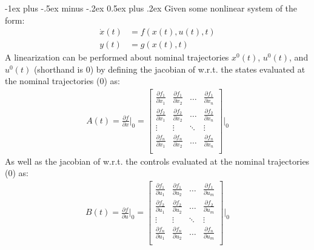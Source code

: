 \documentclass[10pt,landscape]{article}
\makeatletter
\renewcommand{\section}{\@startsection{section}{1}{0mm}%
                                {-1ex plus -.5ex minus -.2ex}%
                                {0.5ex plus .2ex}%
                                {\normalfont\large\bfseries}}
\makeatother
\begin{document}
\begin{multicols}{3}
\section{\color{blue}{Linearization}}
Given some nonlinear system of the form:
\begin{align*}
\dot{x}(t)&=f(x(t),u(t),t)\\
y(t)&=g(x(t),t)
\end{align*}
A linearization can be performed about nominal trajectories $x^0(t)$, $u^0(t)$, and $u^0(t)$ (shorthand is $0$) by defining the jacobian of w.r.t. the states evaluated at the nominal trajectories ($0$) as:
\begin{align*}
A(t)= \frac{\partial f}{\partial x}\Bigr|_0= 
\begin{bmatrix}
    \frac{\partial f_1}{\partial x_1} & \frac{\partial f_1}{\partial x_2} & \dots  & \frac{\partial f_1}{\partial x_n} \\
    \frac{\partial f_2}{\partial x_1} & \frac{\partial f_2}{\partial x_2} & \dots  & \frac{\partial f_2}{\partial x_n} \\
    \vdots & \vdots & \ddots & \vdots \\
    \frac{\partial f_n}{\partial x_1} & \frac{\partial f_n}{\partial x_2} & \dots  & \frac{\partial f_n}{\partial x_n} \\
\end{bmatrix}\Bigr|_0
\end{align*}
As well as the jacobian of w.r.t. the controls evaluated at the nominal trajectories ($0$) as:
\begin{align*}
B(t)= \frac{\partial f}{\partial u}\Bigr|_0= 
\begin{bmatrix}
    \frac{\partial f_1}{\partial u_1} & \frac{\partial f_1}{\partial u_2} & \dots  & \frac{\partial f_1}{\partial u_m} \\
    \frac{\partial f_2}{\partial u_1} & \frac{\partial f_2}{\partial u_2} & \dots  & \frac{\partial f_2}{\partial u_m} \\
    \vdots & \vdots & \ddots & \vdots \\
    \frac{\partial f_n}{\partial u_1} & \frac{\partial f_n}{\partial u_2} & \dots  & \frac{\partial f_n}{\partial u_m} \\
\end{bmatrix}\Bigr|_0
\end{align*}


\end{multicols}
\end{document}
